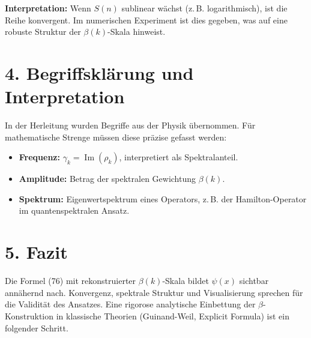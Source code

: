 \documentclass[11pt]{article}
\begin{document}
\textbf{Interpretation:} Wenn $S(n)$ sublinear wächst (z.\,B. logarithmisch), ist die Reihe konvergent. Im numerischen Experiment ist dies gegeben, was auf eine robuste Struktur der $\beta(k)$-Skala hinweist.

\section*{4. Begriffsklärung und Interpretation}

In der Herleitung wurden Begriffe aus der Physik übernommen. Für mathematische Strenge müssen diese präzise gefasst werden:

\begin{itemize}
    \item \textbf{Frequenz:} $\gamma_k = \operatorname{Im}(\rho_k)$, interpretiert als Spektralanteil.
    \item \textbf{Amplitude:} Betrag der spektralen Gewichtung $\beta(k)$.
    \item \textbf{Spektrum:} Eigenwertspektrum eines Operators, z.\,B. der Hamilton-Operator im quantenspektralen Ansatz.
\end{itemize}

\section*{5. Fazit}

Die Formel (76) mit rekonstruierter $\beta(k)$-Skala bildet $\psi(x)$ sichtbar annähernd nach. Konvergenz, spektrale Struktur und Visualisierung sprechen für die Validität des Ansatzes. Eine rigorose analytische Einbettung der $\beta$-Konstruktion in klassische Theorien (Guinand-Weil, Explicit Formula) ist ein folgender Schritt.
\end{document}
